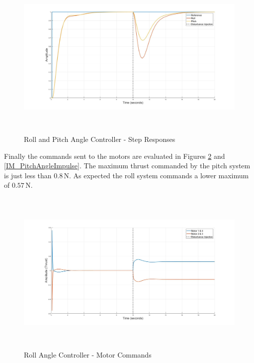 		\begin{figure}[H]
			\centering
			\includegraphics[height = 8cm]{../Design/Matlab/Controllers/roll_pitch_angle_step.jpg}
			\caption{Roll and Pitch Angle Controller -  Step Responses}
			\label{IM_RollAngleStep}
		\end{figure}
		
		Finally the commands sent to the motors are evaluated in Figures \ref{IM_RollAngleImpulse} and \ref{IM_PitchAngleImpulse}. The maximum thrust commanded by the pitch system is just less than $0.8$\,N. As expected the roll system commands a lower maximum of $0.57$\,N.
		
		\begin{figure}[H]
			\centering
			\includegraphics[height = 8cm]{../Design/Matlab/Controllers/roll_angle_impulse.jpg}
			\caption{Roll Angle Controller -  Motor Commands}
			\label{IM_RollAngleImpulse}
		\end{figure}
				
